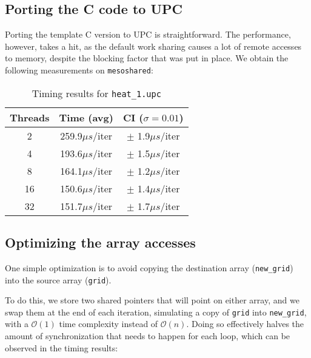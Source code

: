\documentclass[12pt]{article}
\newcommand{\us}[0]{${\mu}s$}
\begin{document}


\subsection{Porting the C code to UPC}

Porting the template C version to UPC is straightforward.
The performance, however, takes a hit, as the default work sharing causes a lot of remote accesses to memory, despite the blocking factor that was put in place.
We obtain the following measurements on \texttt{mesoshared}:



\begin{table}[ht]
  \centering\begin{tabular}{|c|c|c|}
    \hline
    Threads & Time (avg) & CI ($\sigma=0.01$) \\
    \hline
    2 & 259.9\us/iter & $\pm$ 1.9\us/iter \\
    4 & 193.6\us/iter & $\pm$ 1.5\us/iter \\
    8 & 164.1\us/iter & $\pm$ 1.2\us/iter \\
    16 & 150.6\us/iter & $\pm$ 1.4\us/iter \\
    32 & 151.7\us/iter & $\pm$ 1.7\us/iter \\
    \hline
  \end{tabular}
  \caption{Timing results for \texttt{heat\_1.upc}}
  \label{tab:heat1}
\end{table}

\subsection{Optimizing the array accesses}

One simple optimization is to avoid copying the destination array (\texttt{new\_grid}) into the source array (\texttt{grid}).

To do this, we store two shared pointers that will point on either array, and we swap them at the end of each iteration, simulating a copy of \texttt{grid} into \texttt{new\_grid}, with a $\mathcal{O}(1)$ time complexity instead of $\mathcal{O}(n)$.
Doing so effectively halves the amount of synchronization that needs to happen for each loop, which can be observed in the timing results:
\end{document}
